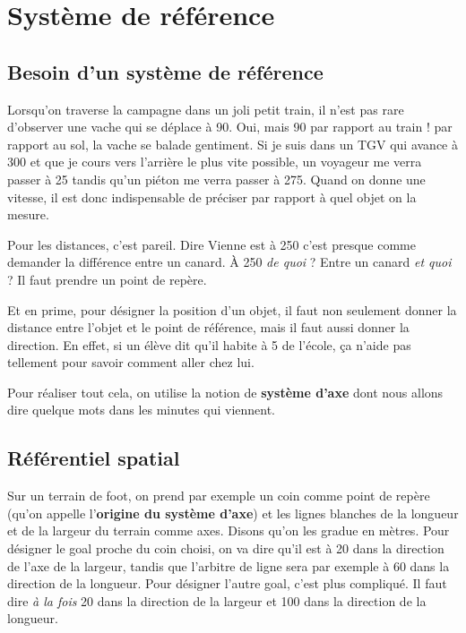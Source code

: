 \documentclass[a4paper,12pt]{book}
\theoremstyle{mes_exemples}	\newtheorem{exemple}[numtho]{Exemple}
\theoremstyle{mes_tho}
\newcommand{\defe}[2]{\textbf{#1}\index{#2}}
\begin{document}
\section{Système de référence}

\subsection{Besoin d'un système de référence}

Lorsqu'on traverse la campagne dans un joli petit train, il n'est pas rare d'observer une vache qui se déplace à \unit{90}{\kilo\meter\per\hour}. Oui, mais \unit{90}{\kilo\meter\per\hour} par rapport au train ! par rapport au sol, la vache se balade gentiment. Si je suis dans un TGV qui avance à \unit{300}{\kilo\meter\per\hour} et que je cours vers l'arrière le plus vite possible, un voyageur me verra passer à \unit{25}{\kilo\meter\per\hour} tandis qu'un piéton me verra passer à \unit{275}{\kilo\meter\per\hour}. Quand on donne une vitesse, il est donc indispensable de préciser par rapport à quel objet on la mesure.

Pour les distances, c'est pareil. Dire \og Vienne est à \unit{250}{\kilo\meter} \fg{} c'est presque comme demander la différence entre un canard. À \unit{250}{\kilo\meter} \emph{de quoi} ? Entre un canard \emph{et quoi} ? Il faut prendre un point de repère.

Et en prime, pour désigner la position d'un objet, il faut non seulement donner la distance entre l'objet et le point de référence, mais il faut aussi donner la direction. En effet, si un élève dit qu'il habite à \unit{5}{\kilo\meter} de l'école, ça n'aide pas tellement pour savoir comment aller chez lui.

Pour réaliser tout cela, on utilise la notion de \defe{système d'axe}{Système d'axe} dont nous allons dire quelque mots dans les minutes qui viennent.  

\subsection{Référentiel spatial}

 Sur un terrain de foot, on prend par exemple un coin comme point de repère (qu'on appelle l'\defe{origine du système d'axe}{Origine!d'un système d'axe}) et les lignes blanches de la longueur et de la largeur du terrain comme axes. Disons qu'on les gradue en mètres. Pour désigner le goal proche du coin choisi, on va dire qu'il est à \unit{20}{\meter} dans la direction de l'axe de la largeur, tandis que l'arbitre de ligne sera par exemple à \unit{60}{\meter} dans la direction de la longueur. Pour désigner l'autre goal, c'est plus compliqué. Il faut dire \emph{à la fois} \unit{20}{\meter} dans la direction de la largeur et \unit{100}{\meter} dans la direction de la longueur.
\end{document}
